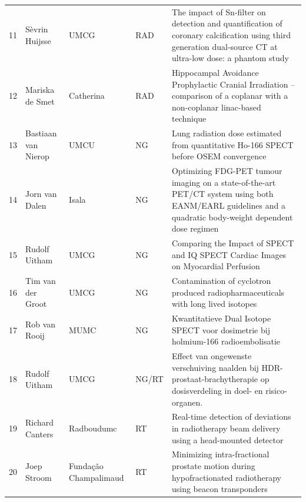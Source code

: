 \documentclass[a4paper,10pt]{report}
\begin{document}
\begin{tabular}{llllp{18cm}}
  11 & Sèvrin Huijsse      & UMCG                  & RAD   & The impact of Sn-filter on detection and quantification of coronary calcification using third generation dual-source CT at ultra-low dose: a phantom study \\
  12 & Mariska de Smet     & Catherina             & RAD   & Hippocampal Avoidance Prophylactic Cranial Irradiation – comparison of a coplanar with a non-coplanar linac-based technique                                \\
  13 & Bastiaan van Nierop & UMCU                  & NG    & Lung radiation dose estimated from quantitative Ho-166 SPECT before OSEM convergence                                                                       \\
  14 & Jorn van Dalen      & Isala                 & NG    & Optimizing FDG-PET tumour imaging on a state-of-the-art PET/CT system using both EANM/EARL guidelines and a quadratic body-weight dependent dose regimen   \\
  15 & Rudolf Uitham       & UMCG                  & NG    & Comparing the Impact of SPECT and IQ SPECT Cardiac Images on Myocardial Perfusion                                                                          \\
  16 & Tim van der Groot   & UMCG                  & NG    & Contamination of cyclotron produced radiopharmaceuticals with long lived isotopes                                                                          \\
  17 & Rob van Rooij       & MUMC                  & NG    & Kwantitatieve Dual Isotope SPECT voor dosimetrie bij holmium-166 radioembolisatie                                                                          \\
  18 & Rudolf Uitham       & UMCG                  & NG/RT & Effect van ongewenste verschuiving naalden bij HDR-prostaat-brachytherapie op dosisverdeling in doel- en risico-organen.                                   \\
  19 & Richard Canters     & Radboudumc            & RT    & Real-time detection of deviations in radiotherapy beam delivery using a head-mounted detector                                                              \\
  20 & Joep Stroom         & Fundação Champalimaud & RT    & Minimizing intra-fractional prostate motion during hypofractionated radiotherapy using beacon transponders                                                 \\
\end{tabular}
\end{document}
